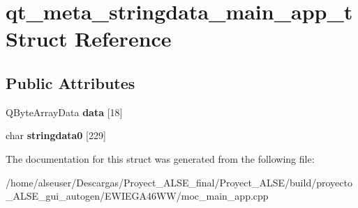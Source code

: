 \hypertarget{structqt__meta__stringdata__main__app__t}{}\section{qt\+\_\+meta\+\_\+stringdata\+\_\+main\+\_\+app\+\_\+t Struct Reference}
\label{structqt__meta__stringdata__main__app__t}
\subsection*{Public Attributes}
\begin{DoxyCompactItemize}
\item 
\mbox{\label{structqt__meta__stringdata__main__app__t_a2542dda2913bba59b7d8e2ec9beb0200}} 
Q\+Byte\+Array\+Data {\bfseries data} \mbox{[}18\mbox{]}
\item 
\mbox{\label{structqt__meta__stringdata__main__app__t_a361fe627da7674ae842bdb04cbbc6ee6}} 
char {\bfseries stringdata0} \mbox{[}229\mbox{]}
\end{DoxyCompactItemize}


The documentation for this struct was generated from the following file\+:\begin{DoxyCompactItemize}
\item 
/home/alseuser/\+Descargas/\+Proyect\+\_\+\+A\+L\+S\+E\+\_\+final/\+Proyect\+\_\+\+A\+L\+S\+E/build/proyecto\+\_\+\+A\+L\+S\+E\+\_\+gui\+\_\+autogen/\+E\+W\+I\+E\+G\+A46\+W\+W/moc\+\_\+main\+\_\+app.\+cpp\end{DoxyCompactItemize}
